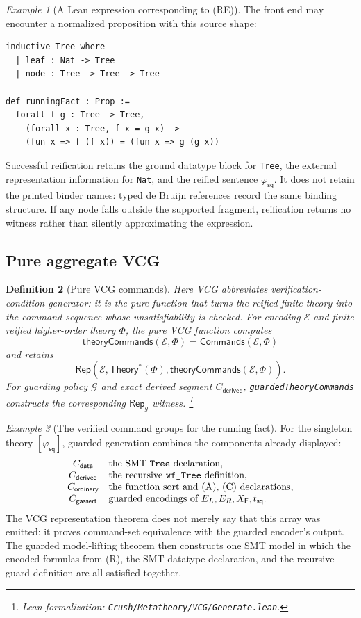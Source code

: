 \documentclass[11pt]{article}
\newtheorem{definition}{Definition}[section]
\theoremstyle{remark}
\newtheorem{example}[definition]{Example}
\newcommand{\leanfile}[1]{\footnote{Lean formalization: \texttt{Crush/Metatheory/#1}.}}
\newcommand{\Theorys}[1]{\mathsf{Theory}^{\!*}(#1)}
\newcommand{\Commands}{\mathsf{Commands}}
\newcommand{\Rep}{\mathsf{Rep}}
\newcommand{\TreeFun}{\mathsf{F}}
\begin{document}
\begin{example}[A Lean expression corresponding to (RE)]
The front end may encounter a normalized proposition with this source shape:
\begin{verbatim}
inductive Tree where
  | leaf : Nat -> Tree
  | node : Tree -> Tree -> Tree

def runningFact : Prop :=
  forall f g : Tree -> Tree,
    (forall x : Tree, f x = g x) ->
    (fun x => f (f x)) = (fun x => g (g x))
\end{verbatim}
Successful reification retains the ground datatype block for \texttt{Tree},
the external representation information for \texttt{Nat}, and the reified
sentence $\varphi_{\mathsf{sq}}$. It does not retain the printed binder names:
typed de Bruijn references record the same binding structure. If any node falls
outside the supported fragment, reification returns no witness rather than
silently approximating the expression.
\end{example}

\subsection{Pure aggregate VCG}

\begin{definition}[Pure VCG commands]
Here VCG abbreviates \emph{verification-condition generator}: it is the pure
function that turns the reified finite theory into the command sequence whose
unsatisfiability is checked.
For encoding $\mathcal E$ and finite reified higher-order theory $\Phi$, the pure
VCG function computes
\[
 \mathsf{theoryCommands}(\mathcal E,\Phi)
 =\Commands(\mathcal E,\Phi)
\]
and retains
\[
 \Rep(\mathcal E,\Theorys{\Phi},
   \mathsf{theoryCommands}(\mathcal E,\Phi)).
\]
For guarding policy $\mathcal G$ and exact derived segment
$C_{\mathsf{derived}}$, \texttt{guardedTheoryCommands} constructs the
corresponding $\Rep_g$ witness.
\leanfile{VCG/Generate.lean}
\end{definition}

\begin{example}[The verified command groups for the running fact]
For the singleton theory $[\varphi_{\mathsf{sq}}]$, guarded generation combines
the components already displayed:
\[
\begin{array}{c@{\quad}l}
 C_{\mathsf{data}} & \text{the SMT \texttt{Tree} declaration},\\
 C_{\mathsf{derived}} & \text{the recursive \texttt{wf\_Tree} definition},\\
 C_{\mathsf{ordinary}} & \text{the function sort and (A), (C) declarations},\\
 C_{\mathsf{gassert}} & \text{guarded encodings of $E_L,E_R,X_{\TreeFun},t_{\mathsf{sq}}$}.
\end{array}
\]
The VCG representation theorem does not merely say that this array was
emitted: it proves command-set equivalence with the guarded encoder's output.
The guarded model-lifting theorem then constructs one SMT model in which the
encoded formulas from (R), the SMT datatype declaration, and the recursive guard
definition are all satisfied together.
\end{example}
\end{document}
